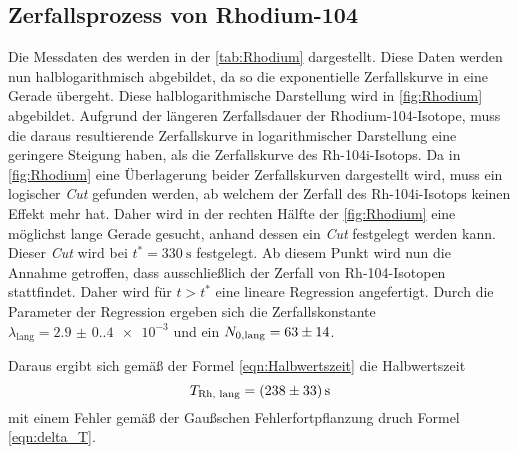 \subsection{Zerfallsprozess von Rhodium-104}
\label{subsec:Rh104}
Die Messdaten des werden in der \autoref{tab:Rhodium} dargestellt. Diese Daten werden nun halblogarithmisch abgebildet, da so die exponentielle Zerfallskurve in eine Gerade
übergeht. Diese halblogarithmische Darstellung wird in \autoref{fig:Rhodium} abgebildet. Aufgrund der längeren Zerfallsdauer der Rhodium-104-Isotope, muss die daraus 
resultierende Zerfallskurve in logarithmischer Darstellung eine geringere Steigung haben, als die Zerfallskurve des Rh-104i-Isotops. Da in \autoref{fig:Rhodium} eine Überlagerung
beider Zerfallskurven dargestellt wird, muss ein logischer \textit{Cut} gefunden werden, ab welchem der Zerfall des Rh-104i-Isotops keinen Effekt mehr hat. Daher wird in der 
rechten Hälfte der \autoref{fig:Rhodium} eine möglichst lange Gerade gesucht, anhand dessen ein \textit{Cut} festgelegt werden kann. Dieser \textit{Cut} wird bei
$t^* = \qty{330}{\second}$ festgelegt. Ab diesem Punkt wird nun die Annahme getroffen, dass ausschließlich der Zerfall von Rh-104-Isotopen stattfindet. Daher wird für $t > t^*$
eine lineare Regression angefertigt. Durch die Parameter der Regression ergeben sich die Zerfallskonstante $\lambda_\text{lang} = \num{2.9(0.4)e-3}$ und ein 
$N_{0,\text{lang}} = \num{63 +- 14}$.

Daraus ergibt sich gemäß der Formel \eqref{eqn:Halbwertszeit} die Halbwertszeit 
\begin{equation*}
  T_\text{Rh, lang} = \qty{238 +- 33}{\second}
\end{equation*}
mit einem Fehler gemäß der Gaußschen Fehlerfortpflanzung druch Formel \eqref{eqn:delta_T}.

